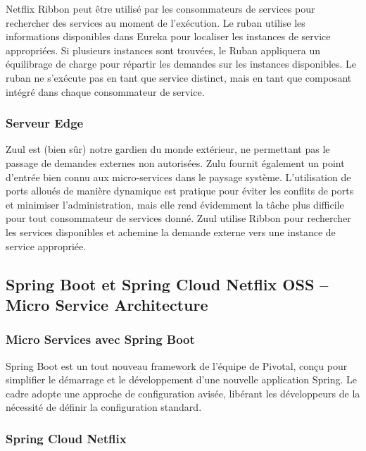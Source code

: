   Netflix Ribbon peut être utilisé par les consommateurs de services pour rechercher des services au moment de l’exécution. Le ruban utilise les informations disponibles dans Eureka pour localiser les instances de service appropriées. Si plusieurs instances sont trouvées, le Ruban appliquera un équilibrage de charge pour répartir les demandes sur les instances disponibles. Le ruban ne s'exécute pas en tant que service distinct, mais en tant que composant intégré dans chaque consommateur de service.





\subsubsection{Serveur Edge} 

  Zuul est (bien sûr) notre gardien du monde extérieur, ne permettant pas le passage de demandes externes non autorisées. Zulu fournit également un point d'entrée bien connu aux micro-services dans le paysage système. L'utilisation de ports alloués de manière dynamique est pratique pour éviter les conflits de ports et minimiser l'administration, mais elle rend évidemment la tâche plus difficile pour tout consommateur de services donné. Zuul utilise Ribbon pour rechercher les services disponibles et achemine la demande externe vers une instance de service appropriée.


\subsection{Spring Boot et Spring Cloud Netflix OSS – Micro Service Architecture}

\subsubsection{Micro Services avec Spring Boot}

 

Spring Boot est un tout nouveau framework de l'équipe de Pivotal, conçu pour simplifier le démarrage et le développement d'une nouvelle application Spring. Le cadre adopte une approche de configuration avisée, libérant les développeurs de la nécessité de définir la configuration standard.

\subsubsection{Spring Cloud Netflix}
 

